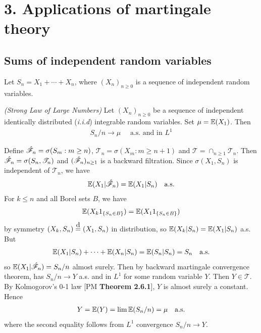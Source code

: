 \documentclass[12pt,a4paper]{report}
\newcommand\xeq{\stackrel{\mathclap{\normalfont\mbox{d}}}{=}}
\newenvironment{proof}
{\begin{changemargin}{1cm}{0.5cm} 
	}%
	{\end{changemargin}
}
\begin{document}
\section*{3. Applications of martingale theory}

\subsection*{Sums of independent random variables}

\newcommand{\T}{\mathscr{T}}

Let $S_n = X_1 + \cdots + X_n$, where $(X_n)_{n\geq 0}$ is a sequence of independent random variables.
\s

 \emph{(Strong Law of Large Numbers)} Let $(X_n)_{n\geq 0}$ be a sequence of independent identically distributed (\emph{i.i.d}) integrable random variables. Set $\mu = \mathbb{E}(X_{1})$. Then
\begin{align*}
S_n / n \rightarrow \mu \quad \text{ a.s. and in } L^1
\end{align*}
\begin{proof}
\pf Define $\hat{\mathscr{F}}_n = \sigma(S_m : m\geq n)$, $\T_n = \sigma(X_m : m\geq n+1)$ and $\T = \cap_{n\geq 1} \T_n$. Then $\hat{\F}_n = \sigma(S_n, \T_n)$ and $(\hat{\mathscr{F}}_n)_{n\geq 1}$ is a backward filtration. Since $\sigma(X_1, S_n)$ is independent of $\T_n$, we have
\begin{align*}
\mathbb{E}(X_1 |\hat{\mathscr{F}}_n) = \mathbb{E}(X_1 |S_n) \quad \text{a.s.}
\end{align*} 
For $k\leq n$ and all Borel sets $B$, we have
\begin{align*}
\mathbb{E}(X_k 1_{ \{S_n \in B \} }) = \mathbb{E}(X_1 1_{\{S_n \in B \} })
\end{align*}
by symmetry $(X_k, S_n) \xeq (X_1, S_n)$ in distribution, so $\mathbb{E}(X_k | S_n) = \mathbb{E}(X_1 |S_n)$ a.s. But
\begin{align*}
\mathbb{E}(X_1 |S_n)+ \cdots + \mathbb{E}(X_n|S_n) = \mathbb{E}(S_n |S_n) = S_n \quad \text{a.s.}
\end{align*} 
so $\mathbb{E}(X_1 |\hat{\mathscr{F}}_n) = S_n /n$ almost surely. Then by backward martingale convergence theorem, has $S_n/n\rightarrow Y$ a.s. and in $L^1$ for some random variable $Y$. Then $Y\in \T$. By Kolmogorov's 0-1 law [PM \textbf{Theorem 2.6.1}], $Y$ is almost surely a constant. Hence
\begin{align*}
Y = \mathbb{E}(Y) = \lim \mathbb{E}(S_n/n) = \mu \quad \text{a.s.}
\end{align*}
where the second equality follows from $L^1$ convergence $S_n/n\rightarrow Y$.

\eop
\end{proof}
\s
\end{document}
